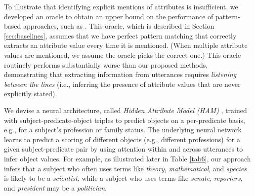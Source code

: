 To illustrate that identifying explicit mentions of attributes is insufficient,
we developed an oracle to obtain an upper bound on the performance of pattern-based approaches, such as \cite{dial7}. This oracle, which is described in Section \ref{sec:baselines}, assumes that we have perfect pattern matching that correctly extracts an attribute value every time it is mentioned.
(When multiple attribute values are mentioned, we assume the oracle picks the correct one.)
This oracle routinely performs substantially worse than our proposed methods, demonstrating that extracting information from utterances requires \textit{listening between the lines}
(i.e., inferring the presence of attribute values that are never explicitly stated).


We devise a neural architecture, called {\em Hidden Attribute Model (HAM)} \cite{tigunova:ham:2019}, 
trained with
subject-predicate-object triples to predict objects on a per-predicate basis,
e.g., for a subject's profession or family status.
The underlying neural network learns to predict a scoring
of different objects (e.g., different professions) for
a given subject-predicate pair
by using attention within and across utterances to infer object values.
For example, as illustrated later in Table \ref{tab6}, our approach infers that a subject
who often uses terms like \textit{theory}, \textit{mathematical}, and \textit{species} is likely to be a \textit{scientist}, while a subject who uses terms like \textit{senate}, \textit{reporters}, and \textit{president} may be a \textit{politician}.


